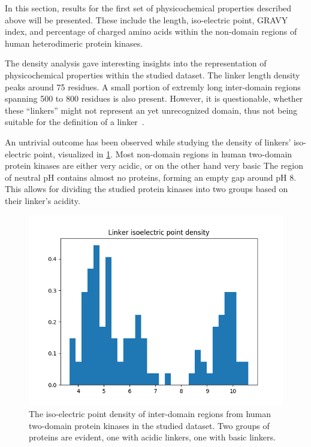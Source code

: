 \label{res}

\label{res:first}

	In this section, results for the first set of physicochemical properties described
	above will be presented.
	These include the length, iso-electric point, GRAVY index, and percentage of charged
	amino acids within the non-domain regions of human heterodimeric protein kinases.

	\label{res:first:dens}

		The density analysis gave interesting insights into the representation of
		physicochemical properties within the studied dataset.
		The linker length density peaks around 75 residues.
		A small portion of extremly long inter-domain regions spanning 500 to 800 residues is
		also present.
		However, it is questionable, whether these ``linkers'' might not represent an yet
		unrecognized domain, thus not being suitable for the definition of a
		linker~\cite{milano2016structural}.

		An untrivial outcome has been observed while studying the density of linkers'
		iso-electric point, visualized in \cref{fig:iso-dens}.
		Most non-domain regions in human two-domain protein kinases are either very acidic, or
		on the other hand very basic
		The region of neutral pH contains almost no proteins, forming an empty gap around pH
		8.
		This allows for dividing the studied protein kinases into two groups based on their
		linker's acidity.

		\begin{figure}
			\centering
			\includegraphics[width=.7\linewidth]{img/iso_density.png}
			\caption{The iso-electric point density of inter-domain regions from human
			two-domain protein kinases in the studied dataset. Two groups of proteins are
			evident, one with acidic linkers, one with basic linkers.}
			\label{fig:iso-dens}
		\end{figure}

